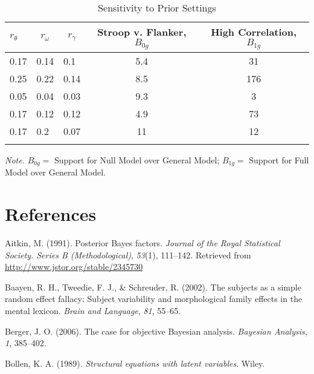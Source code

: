 \documentclass[english,man]{apa6}
\theoremstyle{definition}
\theoremstyle{definition}
\theoremstyle{remark}
\begin{document}
\begin{table}[tbp]
\begin{center}
\begin{threeparttable}
\caption{\label{tab:sens}Sensitivity to Prior Settings}
\begin{tabular}{lllcc}
\toprule
$r_\theta$ & \multicolumn{1}{c}{$r_\omega$} & \multicolumn{1}{c}{$r_\gamma$} & \multicolumn{1}{c}{Stroop v. Flanker, $B_{0g}$} & \multicolumn{1}{c}{High Correlation, $B_{1g}$}\\
\midrule
0.17 & 0.14 & 0.1 & 5.4 & 31\\
0.25 & 0.22 & 0.14 & 8.5 & 176\\
0.05 & 0.04 & 0.03 & 9.3 & 3\\
0.17 & 0.12 & 0.12 & 4.9 & 73\\
0.17 & 0.2 & 0.07 & 11 & 12\\
\bottomrule
\addlinespace
\end{tabular}
\begin{tablenotes}[para]
\textit{Note.} $B_{0g}=$ Support for Null Model over General Model; $B_{1g}=$ Support for Full Model over General Model.
\end{tablenotes}
\end{threeparttable}
\end{center}
\end{table}

\newpage

\section*{References}\label{references}

\hypertarget{refs}{}
\hypertarget{ref-Aitkin:1991}{}
Aitkin, M. (1991). Posterior Bayes factors. \emph{Journal of the Royal
Statistical Society. Series B (Methodological)}, \emph{53}(1), 111--142.
Retrieved from \url{http://www.jstor.org/stable/2345730}

\hypertarget{ref-Baayen:etal:2002}{}
Baayen, R. H., Tweedie, F. J., \& Schreuder, R. (2002). The subjects as
a simple random effect fallacy: Subject variability and morphological
family effects in the mental lexicon. \emph{Brain and Language},
\emph{81}, 55--65.

\hypertarget{ref-Berger:2006}{}
Berger, J. O. (2006). The case for objective Bayesian analysis.
\emph{Bayesian Analysis}, \emph{1}, 385--402.

\hypertarget{ref-Bollen:1989}{}
Bollen, K. A. (1989). \emph{Structural equations with latent variables}.
Wiley.
\end{document}
